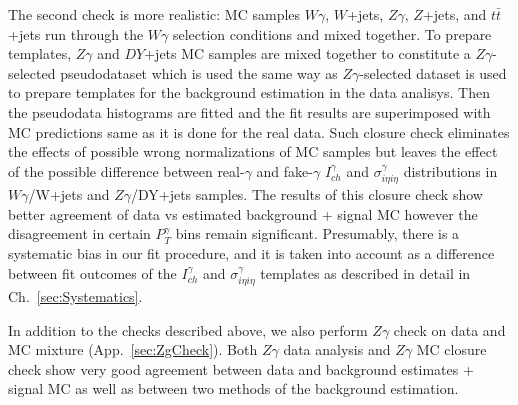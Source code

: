 The second check is more realistic: MC samples $W\gamma$, $W$+jets, $Z\gamma$, $Z$+jets, and $t\bar{t}$+jets run through the $W\gamma$ selection conditions and mixed together. To prepare templates, $Z\gamma$ and $DY$+jets MC samples are mixed together to constitute a $Z\gamma$-selected pseudodataset which is used the same way as $Z\gamma$-selected dataset is used to prepare templates for the background estimation in the data analisys. Then the pseudodata histograms are fitted and the fit results are superimposed with MC predictions same as it is done for the real data. Such closure check eliminates the effects of possible wrong normalizations of MC samples but leaves the effect of the possible difference between real-$\gamma$ and fake-$\gamma$ $I_{ch}^{\gamma}$ and $\sigma_{i\eta i\eta}^{\gamma}$ distributions in $W\gamma$/W+jets and $Z\gamma$/DY+jets samples. The results of this closure check show better agreement of data vs estimated background + signal MC however the disagreement in certain $P_T^{\gamma}$ bins remain significant. Presumably, there is a systematic bias in our fit procedure, and it is taken into account as a difference between fit outcomes of the $I_{ch}^{\gamma}$ and $\sigma_{i\eta i\eta}^{\gamma}$ templates as described in detail in Ch.~\ref{sec:Systematics}.

In addition to the checks described above, we also perform $Z\gamma$ check on data and MC mixture (App.~\ref{sec:ZgCheck}). Both $Z\gamma$ data analysis and $Z\gamma$ MC closure check show very good agreement between data and background estimates + signal MC as well as between two methods of the background estimation.

